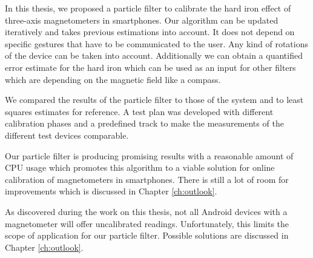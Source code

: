 In this thesis, we proposed a particle filter to calibrate the hard iron effect of three-axis magnetometers in smartphones. Our algorithm can be updated iteratively and takes previous estimations into account. It does not depend on specific gestures that have to be communicated to the user. Any kind of rotations of the device can be taken into account. Additionally we can obtain a quantified error estimate for the hard iron which can be used as an input for other filters which are depending on the magnetic field like a compass.

We compared the results of the particle filter to those of the system and to least squares estimates for reference. A test plan was developed with different calibration phases and a predefined track to make the measurements of the different test devices comparable.

Our particle filter is producing promising results with a reasonable amount of CPU usage which promotes this algorithm to a viable solution for online calibration of magnetometers in smartphones. There is still a lot of room for improvements which is discussed in Chapter \ref{ch:outlook}.

As discovered during the work on this thesis, not all Android devices with a magnetometer will offer uncalibrated readings. Unfortunately, this limits the scope of application for our particle filter. Possible solutions are discussed in Chapter \ref{ch:outlook}.
